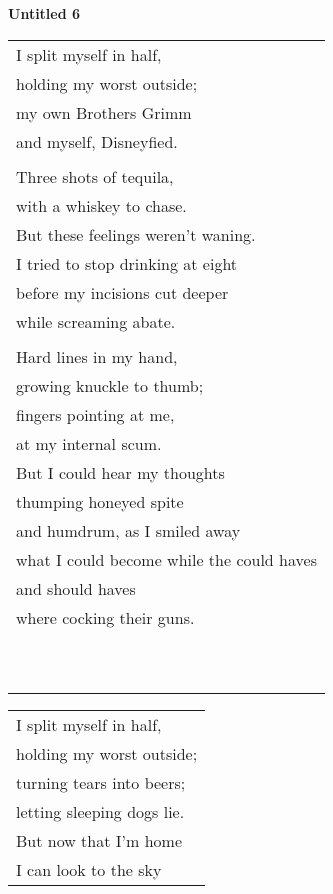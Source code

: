 \documentclass{article}
\begin{document}
\begin{center}
\textbf{Untitled 6} \\
\vspace*{2ex}
\begin{tabular}{l}
I split myself in half, \\
holding my worst outside; \\
my own Brothers Grimm \\
and myself, Disneyfied. \\
\\
Three shots of tequila, \\
with a whiskey to chase. \\
But these feelings weren't waning. \\
I tried to stop drinking at eight \\
before my incisions cut deeper \\
while screaming abate. \\
\\
Hard lines in my hand, \\
growing knuckle to thumb; \\
fingers pointing at me, \\
at my internal scum. \\
But I could hear my thoughts \\
thumping honeyed spite \\
and humdrum, as I smiled away \\
what I could become
while the could haves \\
and should haves \\
where cocking their guns. \\
\\
\\
\\
\\
\\
\\
\\
\\
\\
\\
\end{tabular}
\begin{tabular}{l}
I split myself in half, \\
holding my worst outside; \\
turning tears into beers; \\
letting sleeping dogs lie. \\
But now that I'm home \\
I can look to the sky \\

\end{tabular}
\end{center}
\end{document}
